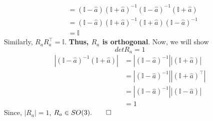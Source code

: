 \documentclass[12pt]{article}
\newcommand{\I}{\mathbb{I}}
\begin{document}
\begin{enumerate}
\begin{enumerate}
\begin{align}
                                        &= (\I - \widehat{a}) (\I + \widehat{a})^{-1} (\I - \widehat{a})^{-1}(\I + \widehat{a})\\
                                        &= (\I - \widehat{a}) (\I + \widehat{a})^{-1} (\I + \widehat{a})(\I - \widehat{a})^{-1}\\
                                        &= \I
                    \end{align}
                    Similarly, $R_a R_a^{\top}=\I$. \textbf{Thus, $R_a$ is orthogonal}. Now, we will show \[ det R_a = 1 \]
                    \begin{align}
                        |(\I - \widehat{a})^{-1}(\I + \widehat{a})| &= |(\I - \widehat{a})^{-1}||(\I + \widehat{a})|\\
                                                            &= |(\I - \widehat{a})^{-1}||(\I + \widehat{a})^{\top}|\\
                                                            &= |(\I - \widehat{a})^{-1}||(\I - \widehat{a})|\\
                                                            &= 1
                    \end{align}
                    Since, $|R_a| = 1$, \textbf{$R_a \in SO(3). \qed$}
            \end{enumerate}
    \end{enumerate}
\end{document}
